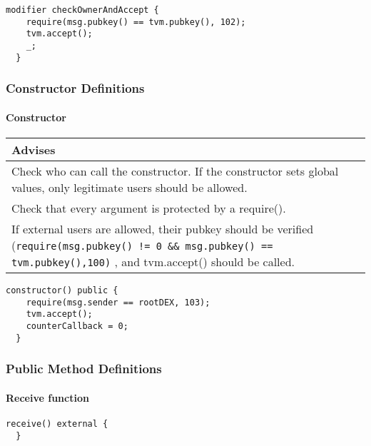 \begin{lstlisting}[firstnumber=79]
  modifier checkOwnerAndAccept {
    require(msg.pubkey() == tvm.pubkey(), 102);
    tvm.accept();
    _;
  }
\end{lstlisting}

\subsubsection{Constructor Definitions}


\paragraph{Constructor}

\ifsoldraft
\noindent\begin{tabular}{|p{12cm}|}\hline
\rowcolor{green}Advises
\\\hline
Check who can call the constructor. If the constructor sets global values, only legitimate users should be allowed.
\\\hline
Check that every argument is protected by a require().
\\\hline
If external users are allowed, their pubkey should be verified (\verb+require(msg.pubkey() != 0 && msg.pubkey() == tvm.pubkey(),100)+ , and tvm.accept() should be called.
\\\hline\end{tabular}
\fi
\vspace{2cm}

\begin{lstlisting}[firstnumber=85]
  constructor() public {
    require(msg.sender == rootDEX, 103);
    tvm.accept();
    counterCallback = 0;
  }
\end{lstlisting}

\subsubsection{Public Method Definitions}


\paragraph{Receive function}

\vspace{2cm}

\begin{lstlisting}[firstnumber=413]
  receive() external {
  }
\end{lstlisting}

